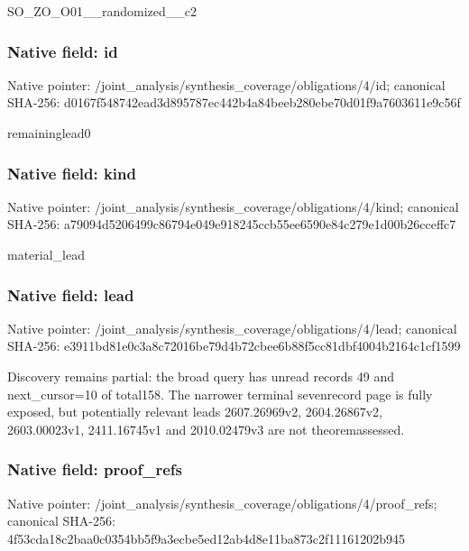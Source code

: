 \documentclass[10pt,a4paper]{article}
\begin{document}
SO\_ZO\_O01\_\_randomized\_\_c2


\subsubsection{Native field: id}


Native pointer: /joint\_analysis/synthesi\allowbreak{}s\_coverage/obligations/4\allowbreak{}/id; canonical SHA-256: d0167f548742ead3d895787e\allowbreak{}c442b4a84beeb280ebe70d01\allowbreak{}f9a7603611e9c56f


remaininglead0


\subsubsection{Native field: kind}


Native pointer: /joint\_analysis/synthesi\allowbreak{}s\_coverage/obligations/4\allowbreak{}/kind; canonical SHA-256: a79094d5206499c86794e049\allowbreak{}e918245ccb55ee6590e84c27\allowbreak{}9e1d00b26cceffc7


material\_lead


\subsubsection{Native field: lead}


Native pointer: /joint\_analysis/synthesi\allowbreak{}s\_coverage/obligations/4\allowbreak{}/lead; canonical SHA-256: e3911bd81e0c3a8c72016be7\allowbreak{}9d4b72cbee6b88f5cc81dbf4\allowbreak{}004b2164c1cf1599


Discovery remains partial: the broad query has unread records 49 and next\_cursor=10 of total158. The narrower terminal sevenrecord page is fully exposed, but potentially relevant leads 2607.26969v2, 2604.26867v2, 2603.00023v1, 2411.16745v1 and 2010.02479v3 are not theoremassessed.


\subsubsection{Native field: proof\_refs}


Native pointer: /joint\_analysis/synthesi\allowbreak{}s\_coverage/obligations/4\allowbreak{}/proof\_refs; canonical SHA-256: 4f53cda18c2baa0c0354bb5f\allowbreak{}9a3ecbe5ed12ab4d8e11ba87\allowbreak{}3c2f11161202b945
\end{document}
